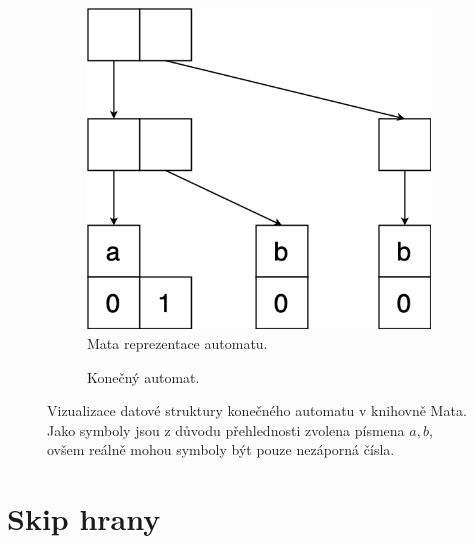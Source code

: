 \begin{figure}[ht]
    \begin{subfigure}{.45\textwidth}
        \centering
        \includegraphics[scale=0.25]{obrazky-figures/mata_aut.png}
        \caption{Mata reprezentace automatu.}
        \label{mata_aut_tr}
    \end{subfigure}%
    \hfil
    \begin{subfigure}{.45\textwidth}
        \centering
        \caption{Konečný automat.}
        \label{mata_aut_aut}
    \end{subfigure}
    \caption{Vizualizace datové struktury konečného automatu v knihovně Mata. Jako symboly jsou z důvodu přehlednosti zvolena písmena $a,b$, ovšem reálně mohou symboly být pouze nezáporná čísla.}
    \label{mata_aut}
\end{figure}

\section{Skip hrany}

